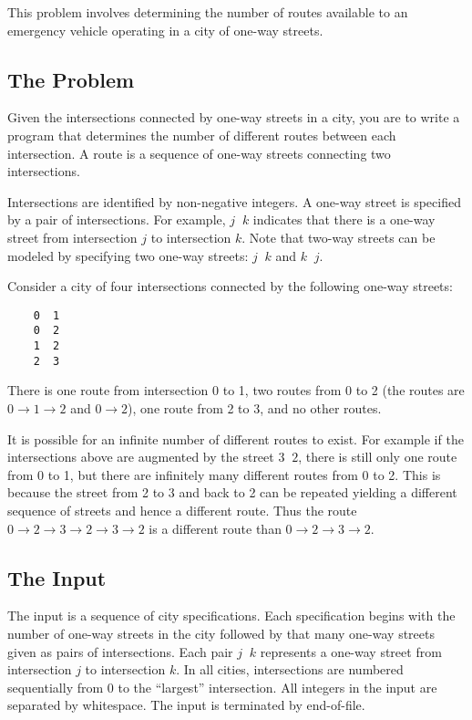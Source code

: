 This problem involves determining the number of routes available to
an emergency vehicle operating in a city of one-way streets.

\subsection*{The Problem}

Given the intersections connected by one-way streets in a city, you are
to write a program that determines the number of different routes
between each intersection.  A route is a sequence of one-way streets
connecting two intersections.

Intersections are identified by non-negative integers.  A one-way
street is specified by a pair of intersections.  For example, $j\;\;k$
indicates that there is a one-way street from intersection  $j$ to
intersection $k$.  Note that two-way streets can be modeled by
specifying two one-way streets: $j\;\;k$ and $k\;\;j$.

Consider a city of four intersections connected by the following one-way
streets:
\begin{verbatim}
    0  1
    0  2
    1  2
    2  3
\end{verbatim}
There is one route from intersection 0 to 1, two routes from 0 to 2 (the
routes are $0 \rightarrow 1 \rightarrow 2$ and $0 \rightarrow 2$), one
route from 2 to 3, and no other routes.


It is possible for an infinite number of different routes to exist.  For
example if the intersections above are augmented by the street $3\;\;2$,
there is still only one route from 0 to 1, but there are infinitely many
different routes from 0 to 2.  This is because the street from 2 to 3
and back to 2 can be repeated yielding a different sequence of streets
and hence a different route.  Thus the route $0 \rightarrow 2
\rightarrow 3 \rightarrow 2 \rightarrow 3 \rightarrow 2$ is a different
route than $0 \rightarrow 2 \rightarrow 3 \rightarrow 2$.

\subsection*{The Input}

The input is a sequence of city specifications.  Each specification
begins with the number of one-way streets in the city followed by that
many one-way streets given as pairs of intersections.  Each pair 
$j\;\;k$ represents a one-way street from intersection $j$ to intersection $k$.
In all cities, intersections are numbered sequentially from 0 to the
``largest'' intersection.  All integers in the input are separated by
whitespace.  The input is terminated by end-of-file.  

